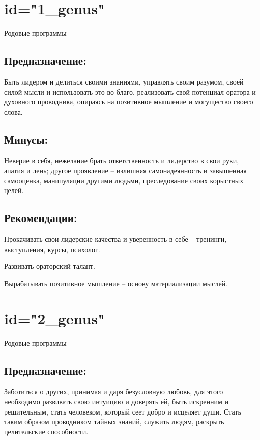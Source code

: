 \section{id="1_genus"}{Родовые программы}

\subsection{Предназначение:}
Быть лидером и делиться своими знаниями, управлять своим разумом, 
своей силой мысли и использовать это во благо, реализовать свой 
потенциал оратора и духовного проводника, опираясь на позитивное 
мышление и могущество своего слова.
\endsubsection

\subsection{Минусы:}
Неверие в себя, нежелание брать ответственность и лидерство в 
свои руки, апатия и лень; другое проявление – излишняя самонадеянность 
и завышенная самооценка, манипуляции другими людьми, преследование 
своих корыстных целей.
\endsubsection

\subsection{Рекомендации:}
\item Прокачивать свои лидерские качества и уверенность в себе – 
тренинги, выступления, курсы, психолог.
\item Развивать ораторский талант.
\item Вырабатывать позитивное мышление – основу материализации мыслей.
\endsubsection

\endsection

\section{id="2_genus"}{Родовые программы}

\subsection{Предназначение:}
Заботиться о других, принимая и даря безусловную любовь, для этого 
необходимо развивать свою интуицию и доверять ей, быть искренним 
и решительным, стать человеком, который сеет добро и исцеляет души. 
Стать таким образом проводником тайных знаний, служить людям, 
раскрыть целительские способности.
\endsubsection

